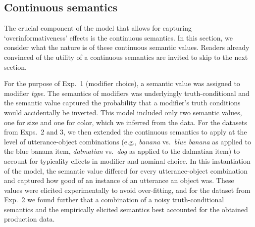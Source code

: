 \documentclass[11pt]{article}
\newcommand{\red}[1]{\textcolor{Red}{#1}}
\newcommand{\tableref}[1]{Table \ref{#1}}
\begin{document}
%

\subsection{Continuous semantics}
\label{sec:contsemantics}

The crucial component of the model that allows for capturing `overinformativeness' effects is the continuous semantics.  In this section, we consider what the nature is of these continuous semantic values. Readers already convinced of the utility of a continuous semantics are invited to skip to the next section.

For the purpose of Exp.~1 (modifier choice), a semantic value was assigned to modifier \emph{type}. The semantics of modifiers was underlyingly truth-conditional and the semantic value captured the probability that a modifier's truth conditions would accidentally be inverted. This model included only two semantic values, one for size and one for color, which we inferred from the data. For the datasets from Exps.~2 and 3, we then extended the continuous semantics to apply at the level of utterance-object  combinations (e.g., \emph{banana} vs.~\emph{blue banana} as applied to the blue banana item, \emph{dalmatian} vs.~\emph{dog} as applied to the dalmatian item) to account for typicality effects in modifier and nominal choice. In this instantiation of the model, the semantic value differed for every utterance-object combination and captured how good of an instance of an utterance an object was. These values were elicited experimentally to avoid over-fitting, and for the dataset from Exp.~2 we found further that a combination of a noisy truth-conditional semantics and the empirically elicited semantics best accounted for the obtained production data. %

\end{document}
